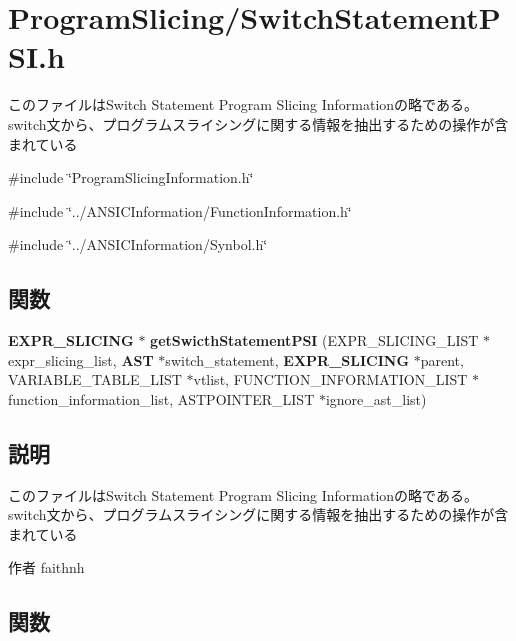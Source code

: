 \section{ProgramSlicing/SwitchStatementPSI.h}
\label{_switch_statement_p_s_i_8h}


このファイルはSwitch Statement Program Slicing Informationの略である。 switch文から、プログラムスライシングに関する情報を抽出するための操作が含まれている  


{\ttfamily \#include \char`\"{}ProgramSlicingInformation.h\char`\"{}}\par
{\ttfamily \#include \char`\"{}../ANSICInformation/FunctionInformation.h\char`\"{}}\par
{\ttfamily \#include \char`\"{}../ANSICInformation/Synbol.h\char`\"{}}\par
\subsection*{関数}
\begin{DoxyCompactItemize}
\item 
{\bf EXPR\_\-SLICING} $\ast$ {\bf getSwicthStatementPSI} (EXPR\_\-SLICING\_\-LIST $\ast$expr\_\-slicing\_\-list, {\bf AST} $\ast$switch\_\-statement, {\bf EXPR\_\-SLICING} $\ast$parent, VARIABLE\_\-TABLE\_\-LIST $\ast$vtlist, FUNCTION\_\-INFORMATION\_\-LIST $\ast$function\_\-information\_\-list, ASTPOINTER\_\-LIST $\ast$ignore\_\-ast\_\-list)
\end{DoxyCompactItemize}


\subsection{説明}
このファイルはSwitch Statement Program Slicing Informationの略である。 switch文から、プログラムスライシングに関する情報を抽出するための操作が含まれている \begin{DoxyAuthor}{作者}
faithnh 
\end{DoxyAuthor}


\subsection{関数}
